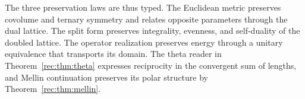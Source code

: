 The three preservation laws are thus typed. The Euclidean metric
preserves covolume and ternary symmetry and relates opposite parameters
through the dual lattice. The split form preserves integrality,
evenness, and self-duality of the doubled lattice. The operator
realization preserves energy through a unitary equivalence that
transports its domain. The theta reader in
Theorem~\ref{rec:thm:theta} expresses reciprocity in the convergent sum
of lengths, and Mellin continuation preserves its polar structure by
Theorem~\ref{rec:thm:mellin}.
